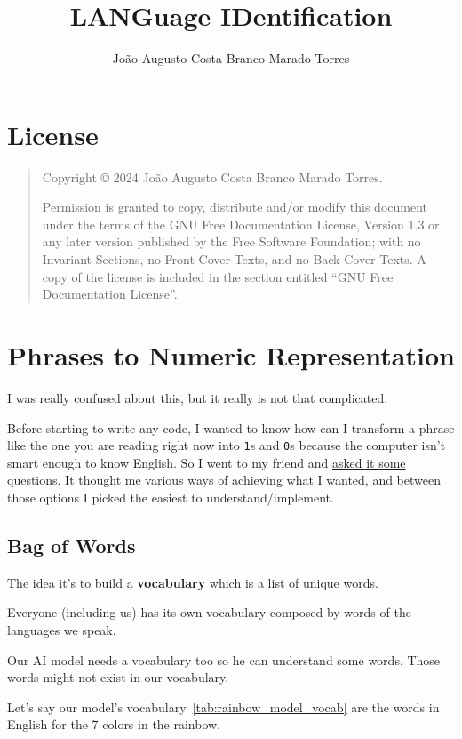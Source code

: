 \documentclass[a4paper,12pt]{article}
\title{LANGuage IDentification}
\author{João Augusto Costa Branco Marado Torres}
\newcommand{\copyrightnotice}{
    Copyright \copyright{}  2024  João Augusto Costa Branco Marado Torres.
}
\newcommand{\licensenotice}{
    \copyrightnotice
    Permission is granted to copy, distribute and/or modify this document
    under the terms of the GNU Free Documentation License, Version 1.3
    or any later version published by the Free Software Foundation;
    with no Invariant Sections, no Front-Cover Texts, and no Back-Cover Texts.
    A copy of the license is included in the section entitled ``GNU
    Free Documentation License''.
}
\theoremstyle{mytheoremstyle}
\theoremstyle{mytheoremstyle}
\theoremstyle{myproblemstyle}
\begin{document}
    \maketitle

    \section*{License}
    \bigskip
    \begin{quote}
        \licensenotice
    \end{quote}
    \bigskip

    \tableofcontents



    \listoffigures

    \section{Phrases to Numeric Representation}

    I was really confused about this, but it really is not that complicated.

    Before starting to write any code, I wanted to know how can I transform a
    phrase like the one you are reading right now into \texttt{1}s and
    \texttt{0}s because the computer isn't smart enough to know English.
    So I went to my friend and
    \href{https://chatgpt.com/share/675976d6-b2c8-8002-964c-a3fff698bcc0}{asked
    it some questions}.
    It thought me various ways of achieving what I wanted, and between those
    options I picked the easiest to understand/implement.

    \subsection{Bag of Words}

    The idea it's to build a \textbf{vocabulary} which is a list of unique
    words.

    Everyone (including us) has its own vocabulary composed by words of the
    languages we speak.

    Our AI model needs a vocabulary too so he can understand some words. Those
    words might not exist in our vocabulary.

    Let's say {our model's vocabulary}~\ref{tab:rainbow_model_vocab} are
    the words in English for the 7 colors in the rainbow.
\end{document}
